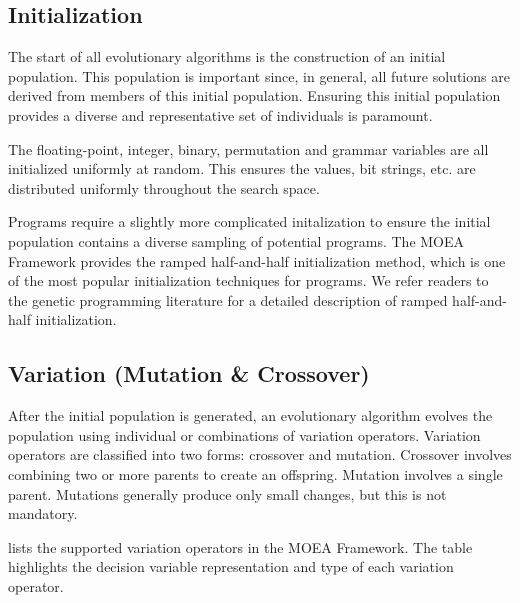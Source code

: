 \subsection{Initialization}
The start of all evolutionary algorithms is the construction of an initial population.  This population is important since, in general, all future solutions are derived from members of this initial population.  Ensuring this initial population provides a diverse and representative set of individuals is paramount.

The floating-point, integer, binary, permutation and grammar variables are all initialized uniformly at random.  This ensures the values, bit strings, etc. are distributed uniformly throughout the search space.

Programs require a slightly more complicated initalization to ensure the initial population contains a diverse sampling of potential programs.  The MOEA Framework provides the ramped half-and-half initialization method, which is one of the most popular initialization techniques for programs.  We refer readers to the genetic programming literature for a detailed description of ramped half-and-half initialization.

\subsection{Variation (Mutation \& Crossover)}
After the initial population is generated, an evolutionary algorithm evolves the population using individual or combinations of variation operators.  Variation operators are classified into two forms: crossover and mutation.  Crossover involves combining two or more parents to create an offspring.  Mutation involves a single parent.  Mutations generally produce only small changes, but this is not mandatory.

 lists the supported variation operators in the MOEA Framework.  The table highlights the decision variable representation and type of each variation operator.


